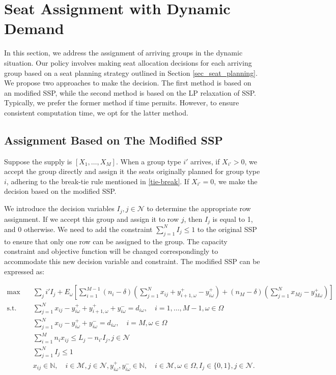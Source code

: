 \section{Seat Assignment with Dynamic Demand}\label{sec_dynamic}
In this section, we address the assignment of arriving groups in the dynamic situation. Our policy involves making seat allocation decisions for each arriving group based on a seat planning strategy outlined in Section \ref{sec_seat_planning}. We propose two approaches to make the decision. The first method is based on an modified SSP, while the second method is based on the LP relaxation of SSP. Typically, we prefer the former method if time permits. However, to ensure consistent computation time, we opt for the latter method.

\subsection{Assignment Based on The Modified SSP}
Suppose the supply is $[X_1, \ldots, X_M]$. When a group type $i{'}$ arrives, if $X_{i{'}} > 0$, we accept the group directly and assign it the seats originally planned for group type $i$, adhering to the break-tie rule mentioned in \ref{tie-break}. If $X_{i{'}} = 0$, we make the decision based on the modified SSP.

We introduce the decision variables $I_j, j \in \mathcal{N}$ to determine the appropriate row assignment. If we accept this group and assign it to row $j$, then $I_j$ is equal to 1, and 0 otherwise. We need to add the constraint $\sum_{j=1}^{N} I_j \leq 1$ to the original SSP to ensure that only one row can be assigned to the group. The capacity constraint and objective function will be changed correspondingly to accommodate this new decision variable and constraint. The modified SSP can be expressed as:

\begin{equation}\label{modified_SSP}
  \begin{aligned}
  \max \quad & \sum_{j} i{'} I_j + E_{\omega}\left[\sum_{i=1}^{M-1} (n_i-\delta) (\sum_{j= 1}^{N} x_{ij} + y_{i+1,\omega}^{+} - y_{i \omega}^{+}) + (n_{M}-\delta) (\sum_{j= 1}^{N} x_{Mj} - y_{M \omega}^{+})\right] \\
  \text {s.t.} \quad & \sum_{j= 1}^{N} x_{ij}-y_{i \omega}^{+}+
  y_{i+1, \omega}^{+} + y_{i \omega}^{-}=d_{i \omega}, \quad i = 1,\ldots,M-1, \omega \in \Omega \\
  & \sum_{j= 1}^{N} x_{ij} -y_{i \omega}^{+}+y_{i \omega}^{-}=d_{i \omega}, \quad i = M, \omega \in \Omega \\
  & \sum_{i=1}^{M} n_{i} x_{ij} \leq L_j - n_{i{'}} I_j, j \in \mathcal{N} \\
  & \sum_{j=1}^{N} I_j \leq 1 \\
  & x_{ij} \in \mathbb{N}, \quad i \in \mathcal{M}, j \in \mathcal{N}, y_{i \omega}^{+}, y_{i \omega}^{-} \in \mathbb{N}, \quad i \in \mathcal{M}, \omega \in \Omega,  I_j \in \{0,1\}, j \in \mathcal{N}.
  \end{aligned}
\end{equation}

